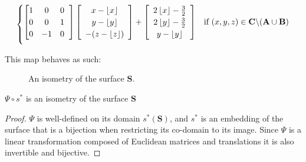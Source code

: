 \documentclass[]{article}
\begin{document}
\begin{Def}
\begin{equation}
\begin{cases}
		\left[ \begin{matrix}
		1 & 0 & 0 \\
		0 & 0 & 1 \\
		0 & -1 & 0
		\end{matrix}\hspace{2mm}\right]
		\left[\begin{array}{c}
			x - \left\lfloor x \right\rfloor
			\\ y- \left\lfloor y \right\rfloor
			\\ -(z - \left\lfloor z \right\rfloor)
			\end{array} \right]
		+
			\left[\begin{array}{c}
				2 \left\lfloor x \right\rfloor - \frac{3}{2}
				\\ 2\left\lfloor y \right\rfloor - \frac{3}{2}
				\\ y - \left\lfloor y \right\rfloor
			\end{array} \right]
				& \text{if } (x,y,z)\in \mathbf{C}\backslash(\mathbf{A}\cup\mathbf{B})	\vspace{2mm}
\end{cases}
\end{equation}
\end{Def}
\noindent This map behaves as such:
\begin{figure}[H]
\centering
 \hspace{0.1in}\raisebox{1.0in}{\text{$\rightarrow$}}\hspace{0.1in}
\raisebox{0.4in}{}
\caption{An isometry of the surface $\mathbf{S}$.}
\label{fig:Psi}
\end{figure}

\begin{lem}
$\Psi\circ s^*$ is an isometry of the surface $\mathbf{S}$
\begin{proof}
$\Psi$ is well-defined on its domain $s^*(\mathbf{S})$, and $s^*$ is an embedding of the surface that is a bijection when restricting its co-domain to its image. Since $\Psi$ is a linear transformation composed of Euclidean matrices and translations it is also invertible and bijective. 
\end{proof}
\end{lem}
\end{document}
